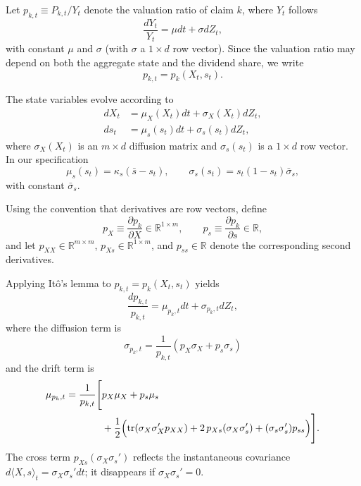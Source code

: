 \documentclass[11pt,english]{article}
\begin{document}
Let $p_{k,t} \equiv P_{k,t}/Y_t$ denote the valuation ratio of claim $k$, where $Y_t$ follows
\begin{equation}
\frac{dY_t}{Y_t} = \mu dt + \sigma dZ_t,
\end{equation}
with constant $\mu$ and $\sigma$ (with $\sigma$ a $1\times d$ row vector). Since the valuation ratio may depend on both the aggregate state and the dividend share, we write
\begin{equation}
p_{k,t} = p_k(X_t,s_t).
\end{equation}

The state variables evolve according to
\begin{align}
dX_t &= \mu_X(X_t)dt + \sigma_X(X_t)dZ_t, \\
ds_t &= \mu_s(s_t)dt + \sigma_s(s_t)dZ_t,
\end{align}
where $\sigma_X(X_t)$ is an $m \times d$ diffusion matrix and $\sigma_s(s_t)$ is a $1\times d$ row vector. In our specification
\begin{equation}
\mu_s(s_t) = \kappa_s(\bar s - s_t),
\qquad
\sigma_s(s_t) = s_t(1-s_t)\bar\sigma_s,
\end{equation}
with constant $\bar\sigma_s$.

Using the convention that derivatives are row vectors, define
\[
p_X \equiv \frac{\partial p_k}{\partial X}\in\mathbb{R}^{1\times m},
\qquad
p_s \equiv \frac{\partial p_k}{\partial s}\in\mathbb{R},
\]
and let $p_{XX}\in\mathbb{R}^{m\times m}$, $p_{Xs}\in\mathbb{R}^{1\times m}$, and $p_{ss}\in\mathbb{R}$ denote the corresponding second derivatives.

Applying It\^{o}'s lemma to $p_{k,t}=p_k(X_t,s_t)$ yields
\begin{equation}
\frac{dp_{k,t}}{p_{k,t}} = \mu_{p_k,t}dt + \sigma_{p_k,t}dZ_t,
\end{equation}
where the diffusion term is
\begin{equation}
\sigma_{p_k,t}
=
\frac{1}{p_{k,t}}
\left(
p_X\sigma_X + p_s\sigma_s
\right)
\end{equation}
and the drift term is
\begin{align}
\mu_{p_k,t}
=
\frac{1}{p_{k,t}}
\Bigg[
&p_X\mu_X + p_s\mu_s \notag\\
&+\frac12
\Big(
\mathrm{tr}(\sigma_X\sigma_X' p_{XX})
+2\,p_{Xs}(\sigma_X\sigma_s')
+(\sigma_s\sigma_s')p_{ss}
\Big)
\Bigg].
\end{align}
The cross term $p_{Xs}(\sigma_X\sigma_s')$ reflects the instantaneous covariance $d\langle X,s\rangle_t=\sigma_X\sigma_s' dt$; it disappears if $\sigma_X\sigma_s'=0$.
\end{document}
